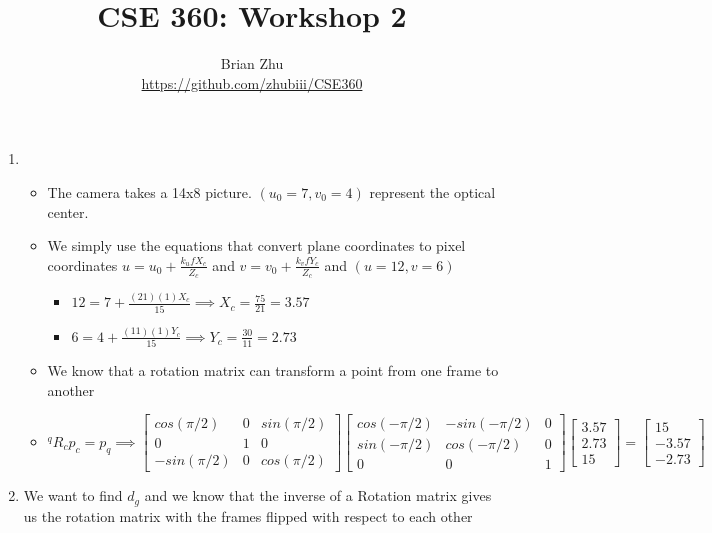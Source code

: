 \documentclass[10pt]{article}
\author{Brian Zhu\\
\url{https://github.com/zhubiii/CSE360} }
\date{}
\title{CSE 360: Workshop 2\\
}
\begin{document}
\maketitle
 
\begin{enumerate}
   \item
   \begin{itemize}
     \item The camera takes a 14x8 picture. $(u_0=7,v_0=4)$ represent the optical center.
     \item We simply use the equations that convert plane coordinates to pixel coordinates $u=u_0+\frac{k_ufX_c}{Z_c}$ and $v=v_0+\frac{k_vfY_c}{Z_c}$ and $(u=12,v=6)$
     \begin{itemize}
        \item $12=7+\frac{(21)(1)X_c}{15} \implies X_c=\frac{75}{21}=3.57$ 
        \item $6=4+\frac{(11)(1)Y_c}{15} \implies Y_c=\frac{30}{11}=2.73$
     \end{itemize}
     \item We know that a rotation matrix can transform a point from one frame to another
     \item $^qR_cp_c=p_q \implies
      \begin{bmatrix}
       cos(\pi/2) & 0 & sin(\pi/2) \\
       0 & 1 & 0 \\
       -sin(\pi/2) & 0 & cos(\pi/2)
      \end{bmatrix}
      \begin{bmatrix}
       cos(-\pi/2) & -sin(-\pi/2) & 0 \\
       sin(-\pi/2) & cos(-\pi/2) & 0 \\
       0 & 0 & 1
      \end{bmatrix}
      \begin{bmatrix}
        3.57\\
        2.73\\
        15
      \end{bmatrix}
      =
      \begin{bmatrix}
        15\\
        -3.57\\
        -2.73
      \end{bmatrix}
      $
   \end{itemize}
  \item We want to find $d_g$ and we know that the inverse of a Rotation matrix gives us the rotation matrix with the frames flipped with respect to each other

\end{enumerate}
\end{document}
